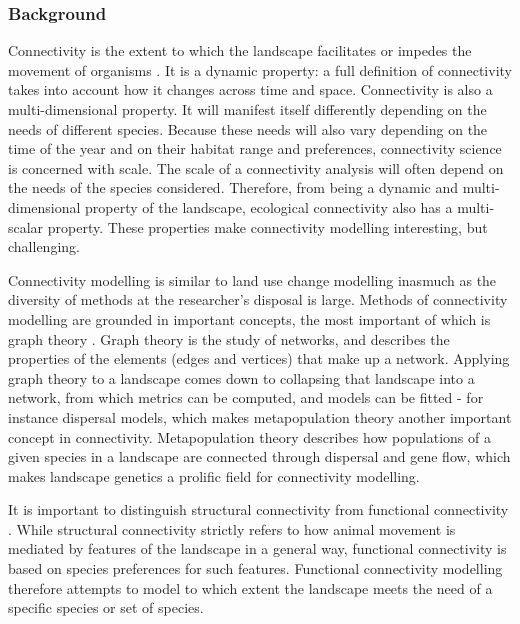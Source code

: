 \subsubsection{Background} %

Connectivity is the extent to which the landscape facilitates or impedes the movement of organisms \citep{crooks_landscape_2006}. It is a dynamic property: a full definition of connectivity takes into account how it changes across time and space. Connectivity is also a multi-dimensional property. It will manifest itself differently depending on the needs of different species. Because these needs will also vary depending on the time of the year and on their habitat range and preferences, connectivity science is concerned with scale. The scale of a connectivity analysis will often depend on the needs of the species considered. Therefore, from being a dynamic and multi-dimensional property of the landscape, ecological connectivity also has a multi-scalar property. These properties make connectivity modelling interesting, but challenging.

Connectivity modelling is similar to land use change modelling inasmuch as the diversity of methods at the researcher’s disposal is large.  Methods of connectivity modelling are grounded in important concepts, the most important of which is graph theory \citep{dale_graphs_2010}. Graph theory is the study of networks, and describes the properties of the elements (edges and vertices) that make up a network. Applying graph theory to a landscape comes down to collapsing that landscape into a network, from which metrics can be computed, and models can be fitted - for instance dispersal models, which makes metapopulation theory another important concept in connectivity\citep{hanski_habitat_1999}. Metapopulation theory describes how populations of a given species in a landscape are connected through dispersal and gene flow, which makes landscape genetics a prolific field for connectivity modelling.

It is important to distinguish structural connectivity from functional connectivity \citep{kindlmann_connectivity_2008}	. While structural connectivity strictly refers to how animal movement is mediated by features of the landscape in a general way, functional connectivity is based on species preferences for such features. Functional connectivity modelling therefore attempts to model to which extent the landscape meets the need of a specific species or set of species.

